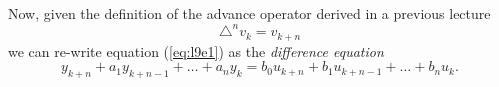 Now, given the definition of the advance operator derived in a
previous lecture $$\triangle^n v_k = v_{k+n}$$ we can re-write
equation (\ref{eq:l9e1}) as the \emph{difference equation}
\begin{equation}\label{eq:l9e2}
  y_{k+n} + a_{1}y_{k+n-1} + \ldots + a_n y_k = b_0
   u_{k+n} + b_{1} u_{k+n-1} + \ldots +  b_n u_k.
\end{equation}

\endinput
